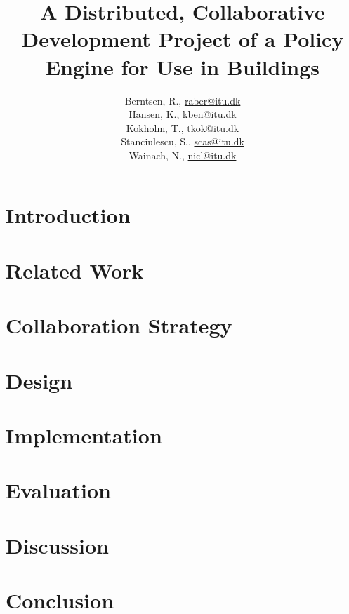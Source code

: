 \documentclass[11pt]{report}
\title{A Distributed, Collaborative Development Project of a Policy Engine for Use in Buildings\\\scalebox{0.85}{Global Software Development}}
\author{Berntsen, R., \url{raber@itu.dk}\\Hansen, K., \url{kben@itu.dk}\\Kokholm, T., \url{tkok@itu.dk}\\Stanciulescu, S., \url{scas@itu.dk}\\Wainach, N., \url{nicl@itu.dk}}
\begin{document}
\maketitle
{}
\begin{abstract}

\end{abstract}

\tableofcontents
\clearpage
{}


\chapter{Introduction}\label{chapter:introduction}


\chapter{Related Work}\label{chapter:relatedwork}


\chapter{Collaboration Strategy}\label{chapter:method}


\chapter{Design}\label{chapter:design}


\chapter{Implementation}\label{chapter:implementation}



\chapter{Evaluation}\label{chapter:evaluation}


\chapter{Discussion}\label{chapter:discussion}


\chapter{Conclusion}\label{chapter:conclusion}
\end{document}
